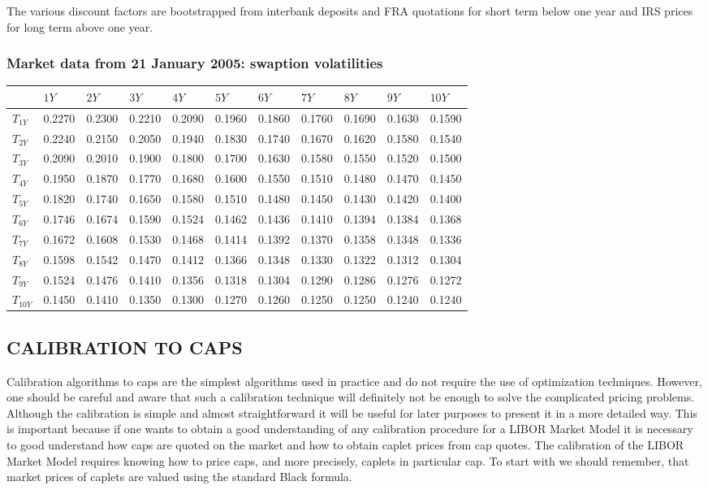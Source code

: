 \documentclass[11pt]{article}
\numberwithin{equation}{subsection}
\begin{document}
\newpage
The various discount factors are bootstrapped from interbank deposits and FRA quotations
for short term below one year and IRS prices for long term above one year.

\subsubsection{Market data from 21 January 2005: swaption volatilities}
\vskip 0.4cm 		
{
	\centering
	\begin{tabular}{|l|l|l|l|l|l|l|l|l|l|l|}
		\hline
		& \(1Y\) & \(2Y\) & \(3Y\) & \(4Y\) & \(5Y\) & \(6Y\) & \(7Y\) & \(8Y\) & \(9Y\) & \(10Y\) \\		
		\hline		
		\(T_{1Y}\) & 0.2270 & 0.2300 & 0.2210 & 0.2090 & 0.1960 & 0.1860 & 0.1760 & 0.1690 & 0.1630 & 0.1590 \\
		\(T_{2Y}\) & 0.2240 & 0.2150 & 0.2050 & 0.1940 & 0.1830 & 0.1740 & 0.1670 & 0.1620 & 0.1580 & 0.1540 \\
		\(T_{3Y}\) & 0.2090 & 0.2010 & 0.1900 & 0.1800 & 0.1700 & 0.1630 & 0.1580 & 0.1550 & 0.1520 & 0.1500 \\
		\(T_{4Y}\) & 0.1950 & 0.1870 & 0.1770 & 0.1680 & 0.1600 & 0.1550 & 0.1510 & 0.1480 & 0.1470 & 0.1450 \\
		\(T_{5Y}\) & 0.1820 & 0.1740 & 0.1650 & 0.1580 & 0.1510 & 0.1480 & 0.1450 & 0.1430 & 0.1420 & 0.1400 \\
		\(T_{6Y}\) & 0.1746 & 0.1674 & 0.1590 & 0.1524 & 0.1462 & 0.1436 & 0.1410 & 0.1394 & 0.1384 & 0.1368 \\
		\(T_{7Y}\) & 0.1672 & 0.1608 & 0.1530 & 0.1468 & 0.1414 & 0.1392 & 0.1370 & 0.1358 & 0.1348 & 0.1336 \\
		\(T_{8Y}\) & 0.1598 & 0.1542 & 0.1470 & 0.1412 & 0.1366 & 0.1348 & 0.1330 & 0.1322 & 0.1312 & 0.1304 \\
		\(T_{9Y}\) & 0.1524 & 0.1476 & 0.1410 & 0.1356 & 0.1318 & 0.1304 & 0.1290 & 0.1286 & 0.1276 & 0.1272 \\
		\(T_{10Y}\)& 0.1450 & 0.1410 & 0.1350 & 0.1300 & 0.1270 & 0.1260 & 0.1250 & 0.1250 & 0.1240 & 0.1240 \\	
		\hline				 				
	\end{tabular}
}
\vskip 0.4cm

\subsection{CALIBRATION TO CAPS}
Calibration algorithms to caps are the simplest algorithms used in practice and do not
require the use of optimization techniques. However, one should be careful and aware that
such a calibration technique will definitely not be enough to solve the complicated pricing
problems. Although the calibration is simple and almost straightforward it will be useful for
later purposes to present it in a more detailed way. This is important because if one wants to
obtain a good understanding of any calibration procedure for a LIBOR Market Model it is
necessary to good understand how caps are quoted on the market and how to obtain caplet
prices from cap quotes.
The calibration of the LIBOR Market Model requires knowing how to price caps, and
more precisely, caplets in particular cap. To start with we should remember, that market
prices of caplets are valued using the standard Black formula.
\end{document}
